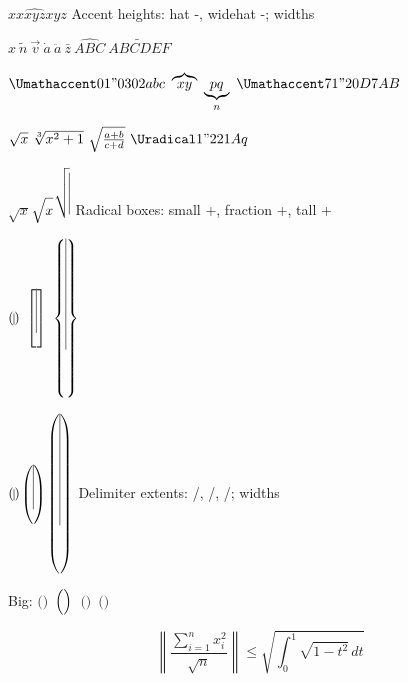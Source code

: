 \documentclass{article}
\begin{document}
\hbox{$\hat{x}$}\hbox{$x$}\hbox{$\widehat{xyz}$}\hbox{$xyz$}
Accent heights: hat \the\dimexpr{}-\relax, widehat \the\dimexpr{}-\relax; widths \the{}\ \the{}\par
$\hat{x}\ \tilde{n}\ \vec{v}\ \dot{a}\ \ddot{a}\ \bar{z}\ \widehat{ABC}\ \widetilde{ABCDEF}$\par
$\Umathaccent 0 1 "0302{abc}\ \overbrace{xy}\ \underbrace{pq}_{n}\ \Umathaccent 7 1 "20D7{AB}$\par
$\sqrt{x}\ \sqrt[3]{x^2+1}\ \sqrt{\frac{a+b}{c+d}}\ \Uradical 1 "221A{q}$\par
{}\hbox{$\sqrt{x}$}\hbox{$\sqrt{\vphantom{\frac{A}{B}}x}$}\hbox{$\sqrt{\vrule height 30pt depth 0pt}$}
Radical boxes: small \the{} +\the{}, fraction \the{} +\the{}, tall \the{} +\the{}\par
$\left( \vrule height 6pt depth 2pt \right)\ \left[ \vrule height 24pt depth 8pt \right]\ \left\{ \vrule height 60pt depth 20pt \right\}$\par
{}\hbox{$\left( \vrule height 6pt depth 2pt \right)$}\hbox{$\left( \vrule height 24pt depth 8pt \right)$}\hbox{$\left( \vrule height 60pt depth 20pt \right)$}
Delimiter extents: \the{}/\the{}, \the{}/\the{}, \the{}/\the{}; widths \the{}\ \the{}\ \the{}\par
Big: \hbox{$\bigl(\bigr)$}\the{}\ \hbox{$\Bigl(\Bigr)$}\the{}\ \hbox{$\biggl(\biggr)$}\the{}\ \hbox{$\Biggl(\Biggr)$}\the{}\par
\[ \left\lVert \frac{\sum_{i=1}^{n} x_i^{2}}{\sqrt{n}} \right\rVert \le \sqrt{\int_0^1 \sqrt{1-t^2}\,dt} \]
\end{document}
